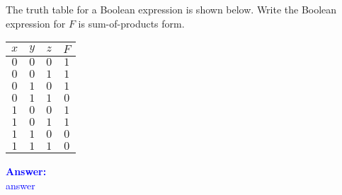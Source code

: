 \item{}
The truth table for a Boolean expression is shown below. Write the Boolean
expression for $F$ is sum-of-products form.\\[12pt]
\begin{tabular}{|c|c|c|c|}
    \hline
    {\bf $x$} & {\bf $y$} & {\bf $z$} & {\bf $F$} \\ \hline\hline
    $0$ & $0$ & $0$ & $1$ \\ \hline
    $0$ & $0$ & $1$ & $1$ \\ \hline
    $0$ & $1$ & $0$ & $1$ \\ \hline
    $0$ & $1$ & $1$ & $0$ \\ \hline
    $1$ & $0$ & $0$ & $1$ \\ \hline
    $1$ & $0$ & $1$ & $1$ \\ \hline
    $1$ & $1$ & $0$ & $0$ \\ \hline
    $1$ & $1$ & $1$ & $0$ \\ \hline
\end{tabular}
\vskip12pt
\ifanswers
\textcolor{blue}{
\textbf{Answer:}\\
answer
}
\newpage
\fi


